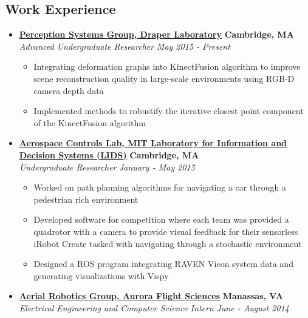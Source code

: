\documentclass[10pt,letterpaper]{article}
\begin{document}
\subsection*{Work Experience}
  \begin{itemize}
    \parskip=-0.1em

    \item[]
    {\href{http://draper.com/}{\textbf{Perception Systems Group, Draper Laboratory}} \hfill
      \textbf{Cambridge, MA}}
    \\
    {\emph{Advanced Undergraduate Researcher} \hfill \emph{May 2015 - Present}}
	
	\begin{itemize}[label=\textbullet]
	\itemsep0em 
	\item Integrating deformation graphs into KinectFusion algorithm to improve scene reconstruction quality in large-scale environments using RGB-D camera depth data
	\item Implemented methods to robustify the iterative closest point component of the KinectFusion algorithm 
	
\end{itemize}

    \item[]
    {\href{http://acl.mit.edu/}{\textbf{Aerospace Controls Lab, MIT Laboratory for Information and Decision Systems (LIDS)}} \hfill
      \textbf{Cambridge, MA}}
    \\
    {\emph{Undergraduate Researcher} \hfill \emph{January - May 2015}}
	
	\begin{itemize}[label=\textbullet]
	\itemsep0em 
	\item Worked on path planning algorithms for navigating a car through a pedestrian rich environment
	\item Developed software for competition where each team was provided a quadrotor with a camera to provide visual feedback for their sensorless iRobot Create tasked with navigating through a stochastic environment
	\item Designed a ROS program integrating RAVEN Vicon system data and generating visualizations with Vispy
	
\end{itemize}

    \item[]
    {\href{http://aurora.aero}{\textbf{Aerial Robotics Group, Aurora Flight Sciences}} \hfill
      \textbf{Manassas, VA}}
    \\
    {\emph{Electrical Engineering and Computer Science Intern} \hfill \emph{June - August 2014}}
	

\end{itemize}
\end{document}
